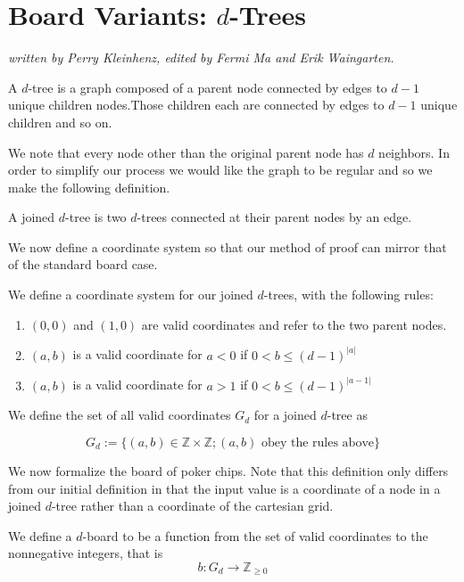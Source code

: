 \documentclass[runningheads,a4paper]{llncs}
\begin{document}
\section{Board Variants: $d$-Trees}
\label{Board Variants: d-Trees}
\emph{written by Perry Kleinhenz, edited by Fermi Ma and Erik Waingarten.}\\


\begin{definition}
A $d$-tree is a graph composed of a parent node connected by edges to $d-1$ unique children nodes.Those children each are connected by edges to $d-1$ unique children and so on.  
\end{definition}
We note that every node other than the original parent node has $d$ neighbors. In order to simplify our process we would like the graph to be regular and so we make the following definition. 
\begin{definition}
A joined $d$-tree is two $d$-trees connected at their parent nodes by an edge.
\end{definition}

We now define a coordinate system so that our method of proof can mirror that of the standard board case.
\begin{definition} We define a coordinate system for our joined $d$-trees, with the following rules:
\begin{enumerate}
	\item $(0,0)$ and $(1,0)$ are valid coordinates and refer to the two parent nodes.
	\item $(a,b)$ is a valid coordinate for $a<0$ if $0<b \leq (d-1)^{|a|}$
	\item $(a,b)$ is a valid coordinate for $a>1$ if $0<b \leq (d-1)^{|a-1|}$
\end{enumerate}
We define the set of all valid coordinates $G_d$ for a joined $d$-tree as 
\end{definition}
\begin{equation*}
G_d:= \{ (a,b) \in \mathbb{Z} \times \mathbb{Z} ; (a,b) \text{ obey the rules above}\}
\end{equation*}


We now formalize the board of poker chips. Note that this definition only differs from our initial definition in that the input value is a coordinate of a node in a joined $d$-tree rather than a coordinate of the cartesian grid.
\begin{definition}
We define a $d$-board to be a function from the set of valid coordinates to the nonnegative integers, that is 
\begin{equation*}
b:  G_d \rightarrow \mathbb{Z}_{\geq 0}
\end{equation*}
\end{definition}
\end{document}
